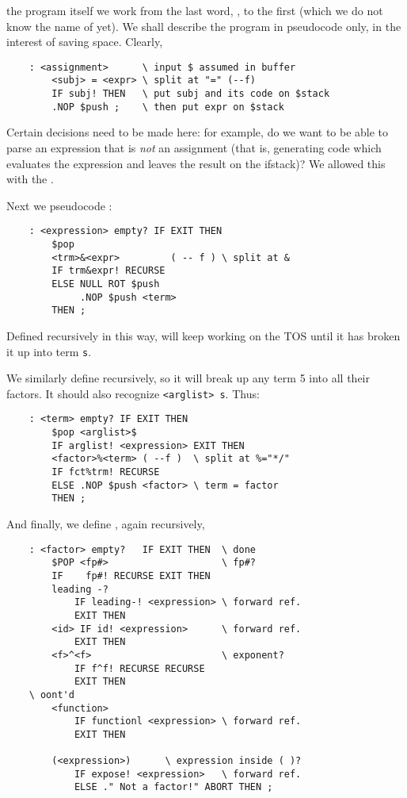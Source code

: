  the program itself we work from the last word, , to the first (which we do not know the name of yet). We shall describe the program in pseudocode only, in the interest of saving space. Clearly,

\begin{lstlisting}
    : <assignment>      \ input $ assumed in buffer
        <subj> = <expr> \ split at "=" (--f)
        IF subj! THEN   \ put subj and its code on $stack
        .NOP $push ;    \ then put expr on $stack
\end{lstlisting}

Certain decisions need to be made here: for example, do we want  to be able to parse an expression that is \textit{not} an assignment (that is, generating code which evaluates the expression and leaves the result on the ifstack)? We allowed this with the .

Next we pseudocode :

\begin{lstlisting}
    : <expression> empty? IF EXIT THEN
        $pop
        <trm>&<expr>         ( -- f ) \ split at &
        IF trm&expr! RECURSE
        ELSE NULL ROT $push
             .NOP $push <term>
        THEN ;
\end{lstlisting}


Defined recursively in this way,  will keep working on the TOS until it has broken it up into term \texttt{s}.

We similarly define  recursively, so it will break up any term 5 into all their factors. It should also recognize \texttt{<arglist> s}. Thus:

\begin{lstlisting}
    : <term> empty? IF EXIT THEN
        $pop <arglist>$
        IF arglist! <expression> EXIT THEN
        <factor>%<term> ( --f )  \ split at %="*/"
        IF fct%trm! RECURSE
        ELSE .NOP $push <factor> \ term = factor
        THEN ;
\end{lstlisting}

And finally, we define , again recursively,

\begin{lstlisting}
    : <factor> empty?   IF EXIT THEN  \ done
        $POP <fp#>                    \ fp#?
        IF    fp#! RECURSE EXIT THEN
        leading -?
            IF leading-! <expression> \ forward ref.
            EXIT THEN
        <id> IF id! <expression>      \ forward ref.
            EXIT THEN
        <f>^<f>                       \ exponent?
            IF f^f! RECURSE RECURSE
            EXIT THEN
    \ oont'd
        <function>
            IF functionl <expression> \ forward ref.
            EXIT THEN

        (<expression>)      \ expression inside ( )?
            IF expose! <expression>   \ forward ref.
            ELSE ." Not a factor!" ABORT THEN ;
\end{lstlisting}

